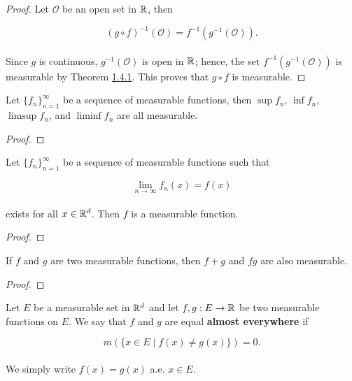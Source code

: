 \documentclass[12pt, a4paper, openany, twoside]{book}
\theoremstyle{definition}
\theoremstyle{remark}
\theoremstyle{plain}
\numberwithin{equation}{section}
\begin{document}
\begin{proof}
    Let $\mathcal{O}$ be an open set in ${\mathbb {R}}$, then 

    \[(g\circ f)^{-1}(\mathcal{O})=f^{-1}(g^{-1}(\mathcal{O})).\]
    \\
    Since $g$ is continuous, $g^{-1}(\mathcal{O})$ is open in ${\mathbb {R}}$; hence, the set $f^{-1}(g^{-1}(\mathcal{O}))$ is measurable by Theorem \hyperref[Theorem 1.4.1]{1.4.1}. This proves that $g\circ f$ is measurable.
\end{proof}
\vspace{5mm}
\begin{tcolorbox}[colback=yellow!10!white,colframe=red!75!black,title=Theorem 1.4.4]\label{Theorem 1.4.4}
    Let $\{f_n\}_{n=1}^{\infty}$ be a sequence of measurable functions, then $\sup{f_n}$, $\inf{f_n}$, $\limsup{f_n}$, and $\liminf{f_n}$ are all measurable.
\end{tcolorbox}
\begin{proof}
    
\end{proof}
\vspace{5mm}
\begin{tcolorbox}[colback=yellow!10!white,colframe=red!75!black,title=Theorem 1.4.5]\label{Theorem 1.4.5}
    Let $\{f_n\}_{n=1}^{\infty}$ be a sequence of measurable functions such that 
    
    \[\lim_{n\rightarrow\infty}{f_n(x)}=f(x)\]
    \\
    exists for all $x\in{\mathbb {R}}^d$. Then $f$ is a measurable function.
\end{tcolorbox}
\begin{proof}
    
\end{proof}
\vspace{5mm}
\begin{tcolorbox}[colback=yellow!10!white,colframe=red!75!black,title=Theorem 1.4.6]\label{Theorem 1.4.6}
    If $f$ and $g$ are two measurable functions, then $f+g$ and $fg$ are also measurable.
\end{tcolorbox}
\begin{proof}
    
\end{proof}
\vspace{5mm}
\begin{tcolorbox}[colback=yellow!10!white,colframe=blue!75!black,title=Definition 1.4.4]\label{Definition 1.4.4}
    Let $E$ be a measurable set in ${\mathbb {R}}^d$ and let $f,g:E\rightarrow{\mathbb {R}}$ be two measurable functions on $E$. We say that $f$ and $g$ are equal \textbf{almost everywhere} if 

    \[m(\{x\in E\mid f(x)\neq g(x)\})=0.\]
    \\
    We simply write $f(x)=g(x)$ a.e. $x\in E$.
\end{tcolorbox}
\vspace{5mm}
\end{document}
